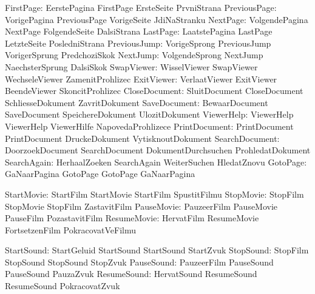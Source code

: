          FirstPage:  EerstePagina      FirstPage            ErsteSeite
                     PrvniStrana
      PreviousPage:  VorigePagina      PreviousPage         VorigeSeite
                     JdiNaStranku
          NextPage:  VolgendePagina    NextPage             FolgendeSeite
                     DalsiStrana
          LastPage:  LaatstePagina     LastPage             LetzteSeite
                     PosledniStrana
      PreviousJump:  VorigeSprong      PreviousJump         VorigerSprung
                     PredchoziSkok
          NextJump:  VolgendeSprong    NextJump             NaechsterSprung
                     DalsiSkok
        SwapViewer:  WisselViewer      SwapViewer           WechseleViewer
                     ZamenitProhlizec
        ExitViewer:  VerlaatViewer     ExitViewer           BeendeViewer
                     SkoncitProhlizec
     CloseDocument:  SluitDocument     CloseDocument        SchliesseDokument
                     ZavritDokument
      SaveDocument:  BewaarDocument    SaveDocument         SpeichereDokument
                     UlozitDokument
        ViewerHelp:  ViewerHelp        ViewerHelp           ViewerHilfe
                     NapovedaProhlizece
     PrintDocument:  PrintDocument     PrintDocument        DruckeDokument
                     VytisknoutDokument
    SearchDocument:  DoorzoekDocument  SearchDocument       DokumentDurchsuchen
                     ProhledatDokument
       SearchAgain:  HerhaalZoeken     SearchAgain          WeiterSuchen
                     HledatZnovu
          GotoPage:  GaNaarPagina      GotoPage             GotoPage %
                     GaNaarPagina %

        StartMovie:  StartFilm         StartMovie           StartFilm
                     SpustitFilmu
         StopMovie:  StopFilm          StopMovie            StopFilm
                     ZastavitFilm
        PauseMovie:  PauzeerFilm       PauseMovie           PauseFilm
                     PozastavitFilm
       ResumeMovie:  HervatFilm        ResumeMovie          FortsetzenFilm
                     PokracovatVeFilmu

        StartSound:  StartGeluid       StartSound           StartSound
                     StartZvuk  %
         StopSound:  StopFilm          StopSound            StopSound
                     StopZvuk   %
        PauseSound:  PauzeerFilm       PauseSound           PauseSound
                     PauzaZvuk  %
       ResumeSound:  HervatSound       ResumeSound          ResumeSound
                     PokracovatZvuk %

